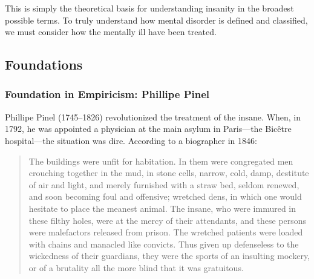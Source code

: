 \begin{refsection}
This is simply the theoretical basis for understanding insanity in the broadest possible terms. To truly understand how mental disorder is defined and classified, we must consider how the mentally ill have been treated.

\subsection{Foundations}
\label{foundations}

\subsubsection{Foundation in Empiricism: Phillipe Pinel}
\label{foundationinempiricism:phillipepinel}

Phillipe Pinel (1745--1826) revolutionized the treatment of the insane. When, in 1792, he was appointed a physician at the main asylum in Paris---the Bicêtre hospital---the situation was dire. According to a biographer in 1846:

\begin{quote}

The buildings were unfit for habitation. In them were congregated men crouching together in the mud, in stone cells, narrow, cold, damp, destitute of air and light, and merely furnished with a straw bed, seldom renewed, and soon becoming foul and offensive; wretched dens, in which one would hesitate to place the meanest animal. The insane, who were immured in these filthy holes, were at the mercy of their attendants, and these persons were malefactors released from prison. The wretched patients were loaded with chains and manacled like convicts. Thus given up defenseless to the wickedness of their guardians, they were the sports of an insulting mockery, or of a brutality all the more blind that it was gratuitous. ~\citep[p. 194--195]{Marx:1847vc}
\end{quote}


\end{refsection}
